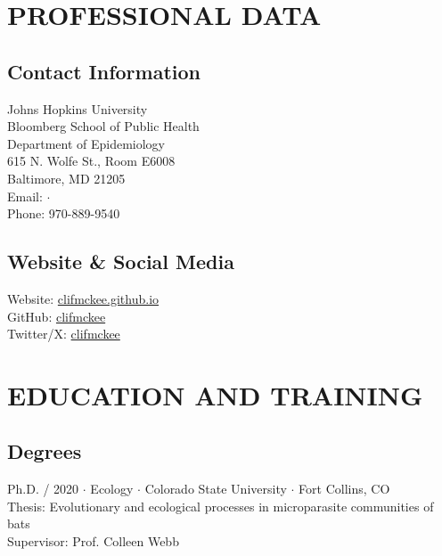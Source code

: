 \documentclass{cv}
\begin{document}


\section*{PROFESSIONAL DATA}

\subsection*{Contact Information}

Johns Hopkins University \\
Bloomberg School of Public Health \\
Department of Epidemiology \\
615 N. Wolfe St., Room E6008\\
Baltimore, MD 21205 \\
Email:  $\cdot$  \\
Phone: 970-889-9540

\subsection*{Website \& Social Media}

Website: \href{https://clifmckee.github.io/}{clifmckee.github.io} \\
GitHub: \href{https://github.com/clifmckee/}{clifmckee} \\
Twitter/X: \href{https://twitter.com/clifmckee/}{clifmckee}


\section*{EDUCATION AND TRAINING}

\subsection*{Degrees}

Ph.D. / 2020 $\cdot$ Ecology $\cdot$ Colorado State University $\cdot$ Fort Collins, CO \\
Thesis: Evolutionary and ecological processes in microparasite communities of bats \\
Supervisor: Prof. Colleen Webb
\end{document}
